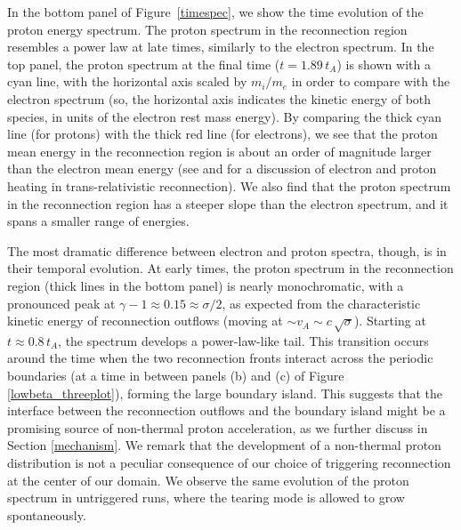 In the bottom panel of Figure~\ref{timespec}, we show the time evolution of the proton energy spectrum.  The proton spectrum in the reconnection region resembles a power law at late times, similarly to the electron spectrum. In the top panel, the proton spectrum at the final time ($t=1.89\,t_{A}$) is shown with a cyan line, with the horizontal axis scaled by $m_i/m_e$ in order to compare with the electron spectrum (so, the horizontal axis indicates the kinetic energy of both species, in units of the electron rest mass energy). By comparing the thick cyan line (for protons) with the thick red line (for electrons), we see that the proton mean energy in the reconnection region  is about an order of magnitude larger than the electron mean energy (see \citealt{rowan2017} and \citealt{werner2018} for a discussion of electron and proton heating in trans-relativistic reconnection). We also find that the proton spectrum in the reconnection region has a steeper slope than the electron spectrum, and it spans a smaller range of energies.

The most dramatic difference between electron and proton spectra, though, is in their temporal evolution. At early times, the proton spectrum in the reconnection region (thick lines in the bottom panel) is nearly monochromatic, with a pronounced peak at $\gamma-1 \approx  0.15 \approx  \sigma/2$, as expected from the characteristic kinetic energy of reconnection outflows (moving at $\sim v_A\sim c \,\sqrt{\sigma}$). Starting at $t\approx0.8\,t_A$, the spectrum develops a power-law-like tail. This transition occurs around the time when the two reconnection fronts interact across the periodic boundaries (at a time in between panels (b) and (c) of Figure \ref{lowbeta_threeplot}), forming the large boundary island. This suggests that the interface between the reconnection outflows and the boundary island might be a promising source of non-thermal proton acceleration, as we further discuss in Section \ref{mechanism}. We remark that the development of a non-thermal proton distribution is not a peculiar consequence of our choice of triggering reconnection at the center of our domain. We observe the same evolution of the proton spectrum in untriggered runs, where the tearing mode is allowed to grow spontaneously.

